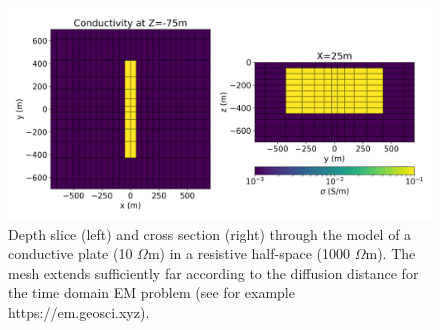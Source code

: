 \begin{figure}
    \begin{center}
    \includegraphics[width=0.8\columnwidth]{figures/plate-model.png}
    \end{center}
\caption{
    Depth slice (left) and cross section (right) through the model of a conductive plate (10 $\Omega$m) in a resistive half-space (1000 $\Omega$m).
    The mesh extends sufficiently far according to the diffusion distance for the time domain EM problem (see for example https://em.geosci.xyz).
}
\label{fig:plate-model}
\end{figure}

